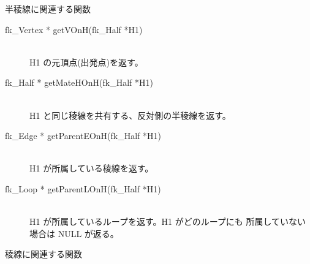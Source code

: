 \begin{center}
{\large 半稜線に関連する関数}
\end{center}
\begin{description}
 \item[\hspace*{0.6cm}fk\_Vertex * getVOnH(fk\_Half *H1)] ~ \\
	H1 の元頂点(出発点)を返す。		

 \item[\hspace*{0.6cm}fk\_Half * getMateHOnH(fk\_Half *H1)] ~ \\
	H1 と同じ稜線を共有する、反対側の半稜線を返す。		

 \item[\hspace*{0.6cm}fk\_Edge * getParentEOnH(fk\_Half *H1)] ~ \\
	H1 が所属している稜線を返す。

 \item[\hspace*{0.6cm}fk\_Loop * getParentLOnH(fk\_Half *H1)] ~ \\
	H1 が所属しているループを返す。H1 がどのループにも
	所属していない場合は NULL が返る。
\end{description}
\begin{center}
{\large 稜線に関連する関数}
\end{center}

